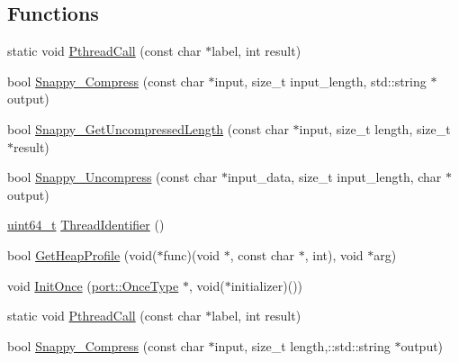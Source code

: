 \subsection*{Functions}
\begin{DoxyCompactItemize}
\item 
static void \hyperlink{namespaceleveldb_1_1port_a614e0b6f0b21d697fe4001dbe3d8798b}{Pthread\+Call} (const char $\ast$label, int result)
\item 
bool \hyperlink{namespaceleveldb_1_1port_ae6e60ac8eb298c7eef3bb70ded8c809f}{Snappy\+\_\+\+Compress} (const char $\ast$input, size\+\_\+t input\+\_\+length, std\+::string $\ast$output)
\item 
bool \hyperlink{namespaceleveldb_1_1port_aad536a786dfc1df63d14c6b74178a73b}{Snappy\+\_\+\+Get\+Uncompressed\+Length} (const char $\ast$input, size\+\_\+t length, size\+\_\+t $\ast$result)
\item 
bool \hyperlink{namespaceleveldb_1_1port_ab6f0c4381b00450e06d3000a8cb48a55}{Snappy\+\_\+\+Uncompress} (const char $\ast$input\+\_\+data, size\+\_\+t input\+\_\+length, char $\ast$output)
\item 
\hyperlink{stdint_8h_aaa5d1cd013383c889537491c3cfd9aad}{uint64\+\_\+t} \hyperlink{namespaceleveldb_1_1port_a4ed107dd29d7ad16a4234c2ba536556c}{Thread\+Identifier} ()
\item 
bool \hyperlink{namespaceleveldb_1_1port_a1686423180e60af953153121c615f5fe}{Get\+Heap\+Profile} (void($\ast$func)(void $\ast$, const char $\ast$, int), void $\ast$arg)
\item 
void \hyperlink{namespaceleveldb_1_1port_a1493e91d494e6f0ea086a743a562e983}{Init\+Once} (\hyperlink{namespaceleveldb_1_1port_a80651a8fb458d9b7b3c1f492f9abd055}{port\+::\+Once\+Type} $\ast$, void($\ast$initializer)())
\item 
static void \hyperlink{namespaceleveldb_1_1port_a614e0b6f0b21d697fe4001dbe3d8798b}{Pthread\+Call} (const char $\ast$label, int result)
\item 
bool \hyperlink{namespaceleveldb_1_1port_a64d0eafc3cfb484000e6afb5cbcc9d87}{Snappy\+\_\+\+Compress} (const char $\ast$input, size\+\_\+t length,\+::std\+::string $\ast$output)
\end{DoxyCompactItemize}
